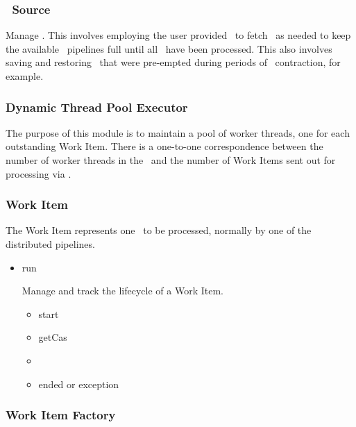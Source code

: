 \begin{itemize}
    \subsubsection{\varCAS~Source}
    
    Manage \varCASes. 
    This involves employing the user provided \varCR~to fetch
    \varCASes~as needed to keep the available \varUIMA~pipelines full
    until all \varCASes~have been processed.
    This also involves saving and restoring \varCASes~that were
    pre-empted during periods of \varJP~contraction, for example.
    
    \subsubsection{Dynamic Thread Pool Executor}
    
    The purpose of this module is to maintain a pool of worker threads,
    one for each outstanding Work Item.
    There is a one-to-one correspondence between the number of worker threads
    in the \varJobDriver~and the number of Work Items sent out for processing
    via \varSendAndReceiveCAS.
    
    \subsubsection{Work Item}
    
    The Work Item represents one \varCAS~to be processed, normally by one of the
    distributed \varUIMA pipelines.
    
    \begin{itemize}
    
      \item run
      
      Manage and track the lifecycle of a Work Item.
      
      \begin{itemize}
        \item start
        \item getCas
        \item \varSendAndReceiveCAS
        \item ended or exception
      \end{itemize}    
      
    \end{itemize}    
     
    \subsubsection{Work Item Factory}
    

\end{itemize}
